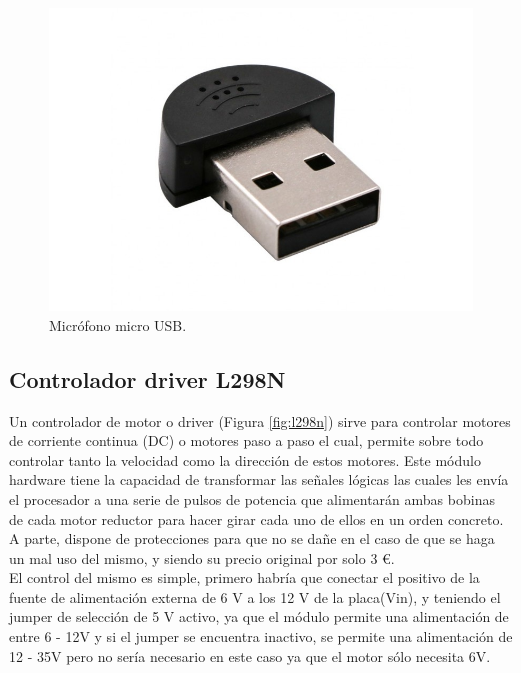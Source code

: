 \begin{figure}[H] %
  \begin{center}
    \includegraphics[scale=0.3]{figs/microfono-usb}
  \end{center}
  \caption{Micrófono micro USB.}
  \label{fig:microfono-usb}
\end{figure}


\subsection{Controlador driver L298N}
\label{subsec:l298n}

Un controlador de motor o driver (Figura \ref{fig:l298n}) sirve para controlar motores de corriente continua (DC) o motores paso a paso el cual, permite sobre todo controlar tanto la velocidad como la dirección de estos motores. Este módulo hardware tiene la capacidad de transformar las señales lógicas las cuales les envía el procesador a una serie de pulsos de potencia que alimentarán ambas bobinas de cada motor reductor para hacer girar cada uno de ellos en un orden concreto. A parte, dispone de protecciones para que no se dañe en el caso de que se haga un mal uso del mismo, y siendo su precio original por solo 3 \euro.\\ 

El control del mismo es simple, primero habría que conectar el positivo de la fuente de alimentación externa de 6 V a los 12 V de la placa(Vin), y teniendo el jumper de selección de 5 V activo, ya que el módulo permite una alimentación de entre 6 - 12V y si el jumper se encuentra inactivo, se permite una alimentación de 12 - 35V pero no sería necesario en este caso ya que el motor sólo necesita 6V. \\

